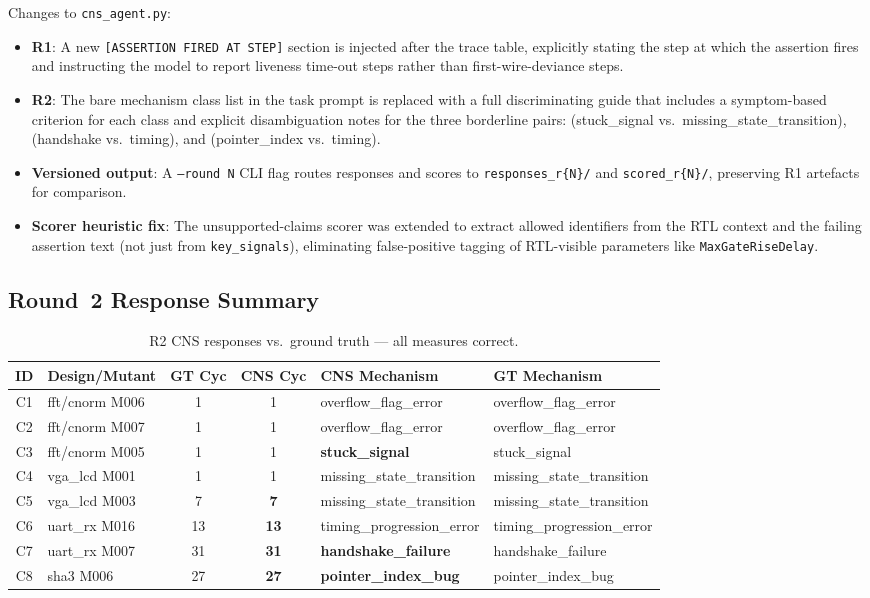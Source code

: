 \documentclass[11pt,a4paper]{article}
\newcommand{\killed}[1]{\textcolor{killgreen}{\textbf{#1}}}
\begin{document}
Changes to \texttt{cns\_agent.py}:
\begin{itemize}
  \item \textbf{R1}: A new \texttt{[ASSERTION FIRED AT STEP]} section is injected
    after the trace table, explicitly stating the step at which the assertion
    fires and instructing the model to report liveness time-out steps rather
    than first-wire-deviance steps.
  \item \textbf{R2}: The bare mechanism class list in the task prompt is replaced
    with a full discriminating guide that includes a symptom-based criterion
    for each class and explicit disambiguation notes for the three
    borderline pairs: (stuck\_signal vs.\ missing\_state\_transition), (handshake
    vs.\ timing), and (pointer\_index vs.\ timing).
  \item \textbf{Versioned output}: A \texttt{--round N} CLI flag routes responses
    and scores to \texttt{responses\_r\{N\}/} and \texttt{scored\_r\{N\}/},
    preserving R1 artefacts for comparison.
  \item \textbf{Scorer heuristic fix}: The unsupported-claims scorer was extended
    to extract allowed identifiers from the RTL context and the failing assertion
    text (not just from \texttt{key\_signals}), eliminating false-positive
    tagging of RTL-visible parameters like \texttt{MaxGateRiseDelay}.
\end{itemize}

\subsection{Round~2 Response Summary}

\begin{table}[H]
\centering
\small
\caption{R2 CNS responses vs.\ ground truth --- all measures correct.}
\label{tab:r2_responses}
\begin{tabular}{clccll}
\toprule
\textbf{ID} & \textbf{Design/Mutant} & \textbf{GT Cyc} & \textbf{CNS Cyc} &
  \textbf{CNS Mechanism} & \textbf{GT Mechanism} \\
\midrule
C1 & fft/cnorm M006 & 1  & 1  & overflow\_flag\_error      & overflow\_flag\_error \\
C2 & fft/cnorm M007 & 1  & 1  & overflow\_flag\_error      & overflow\_flag\_error \\
C3 & fft/cnorm M005 & 1  & 1  & \killed{stuck\_signal}       & stuck\_signal \\
C4 & vga\_lcd M001  & 1  & 1  & missing\_state\_transition & missing\_state\_transition \\
C5 & vga\_lcd M003  & 7  & \killed{7}  & missing\_state\_transition & missing\_state\_transition \\
C6 & uart\_rx M016  & 13 & \killed{13} & timing\_progression\_error & timing\_progression\_error \\
C7 & uart\_rx M007  & 31 & \killed{31} & \killed{handshake\_failure}  & handshake\_failure \\
C8 & sha3 M006      & 27 & \killed{27} & \killed{pointer\_index\_bug}  & pointer\_index\_bug \\
\bottomrule
\end{tabular}
\end{table}
\end{document}
